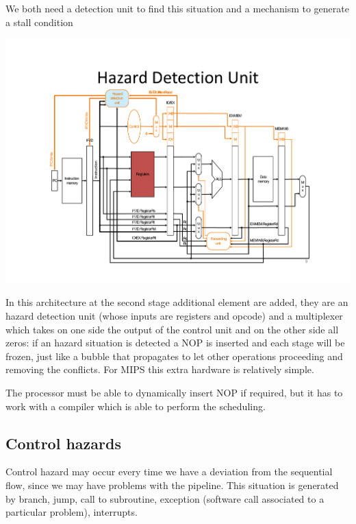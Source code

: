   We both need a detection unit to find this situation and a mechanism to generate a stall condition

  \begin{center}
    \includegraphics[width=1.1\linewidth]{img/img3/mips7}
  \end{center}

  In this architecture at the second stage additional element are added, they are an hazard detection unit (whose inputs are registers and opcode) and a multiplexer which takes on one side the output of the control unit and on the other side all zeros: if an hazard situation is detected a NOP is inserted and each stage will be frozen, just like a bubble that propagates to let other operations proceeding and removing the conflicts. For MIPS this extra hardware is relatively simple.

  The processor must be able to dynamically insert NOP if required, but it has to work with a compiler which is able to perform the scheduling.

\subsection{Control hazards}
Control hazard may occur every time we have a deviation from the sequential flow, since we may have problems with the pipeline. This situation is generated by branch, jump, call to subroutine, exception (software call associated to a particular problem), interrupts.

